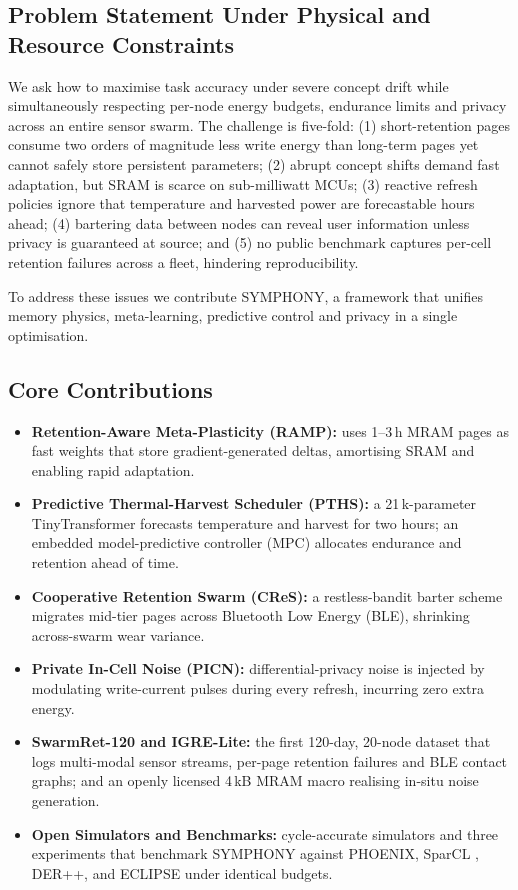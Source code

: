 \documentclass{article}
\begin{document}
\subsection{Problem Statement Under Physical and Resource Constraints}
We ask how to maximise task accuracy under severe concept drift while simultaneously respecting per-node energy budgets, endurance limits and privacy across an entire sensor swarm. The challenge is five-fold: (1) short-retention pages consume two orders of magnitude less write energy than long-term pages yet cannot safely store persistent parameters; (2) abrupt concept shifts demand fast adaptation, but SRAM is scarce on sub-milliwatt MCUs; (3) reactive refresh policies ignore that temperature and harvested power are forecastable hours ahead; (4) bartering data between nodes can reveal user information unless privacy is guaranteed at source; and (5) no public benchmark captures per-cell retention failures across a fleet, hindering reproducibility.

To address these issues we contribute SYMPHONY, a framework that unifies memory physics, meta-learning, predictive control and privacy in a single optimisation.

\subsection{Core Contributions}
\begin{itemize}
  \item \textbf{Retention-Aware Meta-Plasticity (RAMP):} uses 1--3\,h MRAM pages as fast weights that store gradient-generated deltas, amortising SRAM and enabling rapid adaptation.
  \item \textbf{Predictive Thermal-Harvest Scheduler (PTHS):} a 21\,k-parameter TinyTransformer forecasts temperature and harvest for two hours; an embedded model-predictive controller (MPC) allocates endurance and retention ahead of time.
  \item \textbf{Cooperative Retention Swarm (CReS):} a restless-bandit barter scheme migrates mid-tier pages across Bluetooth Low Energy (BLE), shrinking across-swarm wear variance.
  \item \textbf{Private In-Cell Noise (PICN):} differential-privacy noise is injected by modulating write-current pulses during every refresh, incurring zero extra energy.
  \item \textbf{SwarmRet-120 and IGRE-Lite:} the first 120-day, 20-node dataset that logs multi-modal sensor streams, per-page retention failures and BLE contact graphs; and an openly licensed 4\,kB MRAM macro realising in-situ noise generation.
  \item \textbf{Open Simulators and Benchmarks:} cycle-accurate simulators and three experiments that benchmark SYMPHONY against PHOENIX, SparCL \cite{wang-2022-sparcl}, DER++, and ECLIPSE under identical budgets.
\end{itemize}
\end{document}
